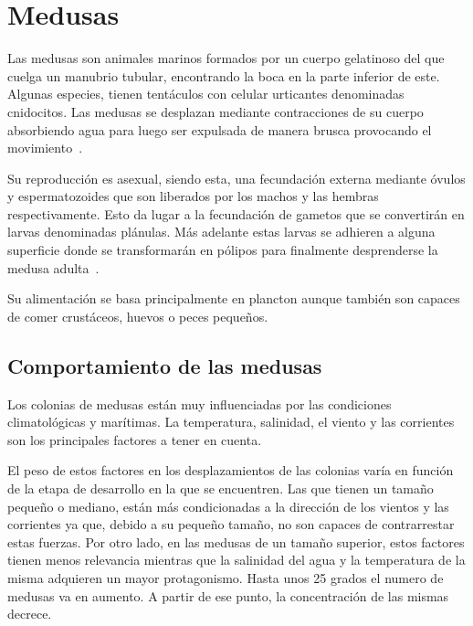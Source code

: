 

\section{Medusas}
Las medusas son animales marinos formados por un cuerpo gelatinoso del que cuelga un manubrio tubular, encontrando la boca en la parte inferior de este. Algunas especies, tienen tentáculos con celular urticantes denominadas cnidocitos. Las medusas se desplazan mediante contracciones de su cuerpo absorbiendo agua para luego ser expulsada de manera brusca provocando el movimiento~\cite{wiki:medusas}.

Su reproducción es asexual, siendo esta, una fecundación externa mediante óvulos y espermatozoides que son liberados por los machos y las hembras respectivamente. Esto da lugar a la fecundación de gametos que se convertirán en larvas denominadas plánulas. Más adelante estas larvas se adhieren a alguna superficie donde se transformarán en pólipos para finalmente desprenderse la medusa adulta~\cite{noauthor_reproduccion_2016}.


Su alimentación se basa principalmente en plancton aunque también son capaces de comer crustáceos, huevos o peces pequeños.

\subsection{Comportamiento de las medusas}
Los colonias de medusas están muy influenciadas por las condiciones climatológicas y marítimas. La temperatura, salinidad, el viento y las corrientes son los principales factores a tener en cuenta.

El peso de estos factores en los desplazamientos de las colonias varía en función de la etapa de desarrollo en la que se encuentren. Las que tienen un tamaño pequeño o mediano, están más condicionadas a la dirección de los vientos y las corrientes ya que, debido a su pequeño tamaño, no son capaces de contrarrestar estas fuerzas. Por otro lado, en las medusas de un tamaño superior, estos factores tienen menos relevancia mientras que la salinidad del agua y la temperatura de la misma adquieren un mayor protagonismo. Hasta unos 25 grados el numero de medusas va en aumento. A partir de ese punto, la concentración de las mismas decrece.

